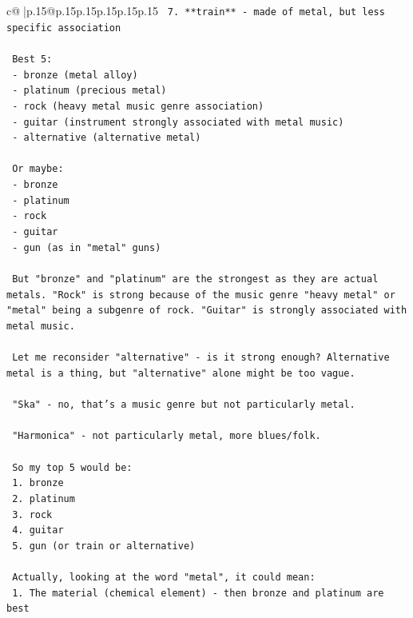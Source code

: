 \documentclass{article}
\begin{document}
{\begin{supertabular}{c@{$\;$}|p{.15\linewidth}@{}p{.15\linewidth}p{.15\linewidth}p{.15\linewidth}p{.15\linewidth}p{.15\linewidth}}
{{{\texttt{ 7. **train** {-} made of metal, but less specific association} \\
\\ 
\texttt{ Best 5:} \\
\texttt{ {-} bronze (metal alloy)} \\
\texttt{ {-} platinum (precious metal)} \\
\texttt{ {-} rock (heavy metal music genre association)} \\
\texttt{ {-} guitar (instrument strongly associated with metal music)} \\
\texttt{ {-} alternative (alternative metal)} \\
\\ 
\texttt{ Or maybe:} \\
\texttt{ {-} bronze} \\
\texttt{ {-} platinum} \\
\texttt{ {-} rock} \\
\texttt{ {-} guitar} \\
\texttt{ {-} gun (as in "metal" guns)} \\
\\ 
\texttt{ But "bronze" and "platinum" are the strongest as they are actual metals. "Rock" is strong because of the music genre "heavy metal" or "metal" being a subgenre of rock. "Guitar" is strongly associated with metal music.} \\
\\ 
\texttt{ Let me reconsider "alternative" {-} is it strong enough? Alternative metal is a thing, but "alternative" alone might be too vague.} \\
\\ 
\texttt{ "Ska" {-} no, that's a music genre but not particularly metal.} \\
\\ 
\texttt{ "Harmonica" {-} not particularly metal, more blues/folk.} \\
\\ 
\texttt{ So my top 5 would be:} \\
\texttt{ 1. bronze} \\
\texttt{ 2. platinum} \\
\texttt{ 3. rock} \\
\texttt{ 4. guitar} \\
\texttt{ 5. gun (or train or alternative)} \\
\\ 
\texttt{ Actually, looking at the word "metal", it could mean:} \\
\texttt{ 1. The material (chemical element) {-} then bronze and platinum are best} \\
}}}
\end{supertabular}}
\end{document}
